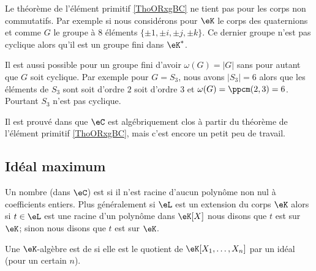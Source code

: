 \begin{example}
    Le théorème de l'élément primitif \ref{ThoORxgBC} ne tient pas pour les corps non commutatifs. Par exemple si nous considérons pour \( \eK\) le corps des quaternions et comme \( G\) le groupe à \( 8\) éléments \( \{ \pm 1,\pm i,\pm j,\pm k \}\). Ce dernier groupe n'est pas cyclique alors qu'il est un groupe fini dans \( \eK^*\).
\end{example}

\begin{example}
    Il est aussi possible pour un groupe fini d'avoir \( \omega(G)=| G |\) sans pour autant que \( G\) soit cyclique. Par exemple pour \( G=S_3\), nous avons \( | S_3 |=6\) alors que les éléments de \( S_3\) sont soit d'ordre \( 2\) soit d'ordre \( 3\) et \( \omega(G)=\ppcm(2,3)=6\). Pourtant \( S_3\) n'est pas cyclique.
\end{example}


\begin{remark}
    Il est prouvé dans \cite{rqrNyg} que \( \eC\) est algébriquement clos à partir du théorème de l'élément primitif \ref{ThoORxgBC}, mais c'est encore un petit peu de travail.
\end{remark}

\subsection{Idéal maximum}

\begin{definition}
    Un nombre (dans \( \eC\)) est  si il n'est racine d'aucun polynôme non nul à coefficients entiers. Plus généralement si \( \eL\) est un extension du corps \( \eK\) alors si \( t\in \eL\) est une racine d'un polynôme dans \( \eK[X]\) nous disons que \( t\) est  sur \( \eK\); sinon nous disons que \( t\) est  sur \( \eK\).
\end{definition}

\begin{definition}  \label{DefWHDdTrC}
    Une \( \eK\)-algèbre est de  si elle est le quotient de \( \eK[X_1,\ldots, X_n]\) par un idéal (pour un certain \( n\)).
\end{definition}

